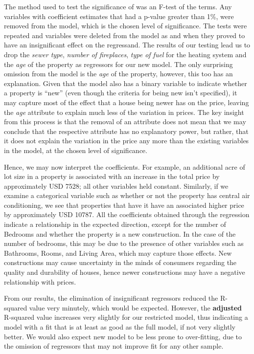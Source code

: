 \documentclass[letterpaper,9pt,twocolumn,twoside,]{pinp}
\begin{document}
The method used to test the significance of was an F-test of the terms.
Any variables with coefficient estimates that had a p-value greater than
1\%, were removed from the model, which is the chosen level of
significance. The tests were repeated and variables were deleted from
the model as and when they proved to have an insignificant effect on the
regressand. The results of our testing lead us to drop the \emph{sewer
type}, \emph{number of fireplaces}, \emph{type of fuel} for the heating
system and the \emph{age} of the property as regressors for our new
model. The only surprising omission from the model is the \emph{age} of
the property, however, this too has an explanation. Given that the model
also has a binary variable to indicate whether a property is ``new''
(even though the criteria for being new isn't specified), it may capture
most of the effect that a house being newer has on the price, leaving
the \emph{age} attribute to explain much less of the variation in
prices. The key insight from this process is that the removal of an
attribute does not mean that we may conclude that the respective
attribute has no explanatory power, but rather, that it does not explain
the variation in the price any more than the existing variables in the
model, at the chosen level of significance.

Hence, we may now interpret the coefficients. For example, an additional
acre of lot size in a property is associated with an increase in the
total price by approximately USD 7528; all other variables held
constant. Similarly, if we examine a categorical variable such as
whether or not the property has central air conditioning, we see that
properties that have it have an associated higher price by approximately
USD 10787. All the coefficients obtained through the regression indicate
a relationship in the expected direction, except for the number of
Bedrooms and whether the property is a new construction. In the case of
the number of bedrooms, this may be due to the presence of other
variables such as Bathrooms, Rooms, and Living Area, which may capture
those effects. New constructions may cause uncertainty in the minds of
consumers regarding the quality and durability of houses, hence newer
constructions may have a negative relationship with prices.

From our results, the elimination of insignificant regressors reduced
the R-squared value very minutely, which would be expected. However, the
\textbf{adjusted} R-squared value increases very slightly for our
restricted model, thus indicating a model with a fit that is at least as
good as the full model, if not very slightly better. We would also
expect new model to be less prone to over-fitting, due to the omission
of regressors that may not improve fit for any other sample.
\end{document}

